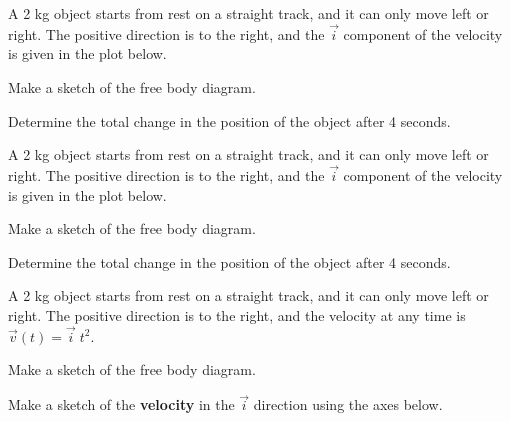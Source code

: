 \begin{problem}
\item A 2 kg object starts from rest on a straight track, and it can
  only move left or right. The positive direction is to the right, and
  the $\vec{i}$ component of the velocity is given in the plot below.

  \scalebox{0.5}{}

  \begin{subproblem}
    \item Make a sketch of the free body diagram.
      \vspace{4em}
    \item Determine the total change in the position of the object
      after 4 seconds.
      \vfill
  \end{subproblem}
  \clearpage

\item A 2 kg object starts from rest on a straight track, and it can
  only move left or right. The positive direction is to the right, and
  the $\vec{i}$ component of the velocity is given in the plot below.

  \scalebox{0.5}{}

  \begin{subproblem}
    \item Make a sketch of the free body diagram.
      \vspace{4em}
    \item Determine the total change in the position of the object
      after 4 seconds.  
      \vfill
  \end{subproblem}
  \clearpage

\item A 2 kg object starts from rest on a straight track, and it can
  only move left or right. The positive direction is to the right, and
  the velocity at any time is $\vec{v}(t)=\vec{i} \; t^2$.

  \begin{subproblem}
    \item Make a sketch of the free body diagram.
      \vspace{4em}
    \item Make a sketch of the \textbf{velocity} in the $\vec{i}$
      direction using the axes below.

      \scalebox{0.5}{}


\end{subproblem}
\end{problem}
